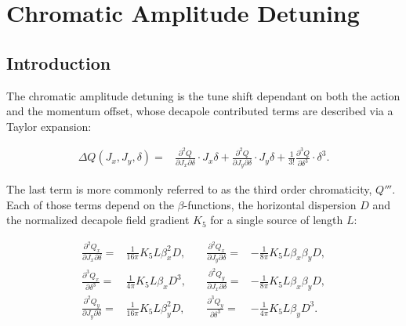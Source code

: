 \section{Chromatic Amplitude Detuning}



\subsection{Introduction}

The chromatic amplitude detuning is the tune shift dependant on both the action and the momentum
offset, whose decapole contributed terms are described via a Taylor expansion: 

\begin{equation}
  \begin{aligned}
    \Delta Q(J_x, J_y, \delta) = 
    & \frac{\partial^2Q}{\partial J_x \partial \delta}    \cdot J_x\delta 
    + \frac{\partial^2 Q}{\partial J_y \partial \delta}   \cdot J_y\delta 
    + \frac{1}{3!} \frac{\partial^3 Q}{\partial \delta^3} \cdot \delta^3.
    \end{aligned}
    \label{eq:cad}
\end{equation}


The last term is more commonly referred to as the third order chromaticity, $Q'''$.  Each of those
terms depend on the $\beta$-functions, the horizontal dispersion $D$ and the normalized decapole field
gradient $K_5$ for a single source of length $L$:

\begin{equation}\begin{aligned}
  \frac{\partial^2 Q_x}{\partial J_x \partial \delta} =& \frac{1}{16 \pi} K_5L \beta_x^2 D,         &\quad
  \frac{\partial^2 Q_x}{\partial J_y \partial \delta} =& -\frac{1}{8\pi} K_5L \beta_x \beta_y D,
\\
  \frac{\partial^3 Q_x}{\partial \delta^3}            =& \frac{1}{4\pi} K_5L \beta_x D^3,           &\quad
  \frac{\partial^2 Q_y}{\partial J_x \partial \delta} =& -\frac{1}{8\pi} K_5L \beta_x \beta_y D,
\\
  \frac{\partial^2 Q_y}{\partial J_y \partial \delta} =& \frac{1}{16 \pi} K_5L \beta_y^2 D,        &\quad 
  \frac{\partial^3 Q_y}{\partial \delta^3}            =& -\frac{1}{4\pi} K_5L \beta_y D^3.
\end{aligned}\end{equation}

